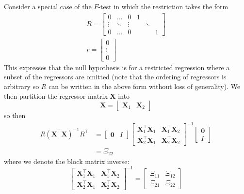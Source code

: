 \documentclass[11pt]{report} %
\begin{document}
Consider a special case of the $F$-test in which the restriction takes the form
\begin{gather}
R = \left[\begin{array}{ccc|ccc}
0 & \dots & 0 & 1 \\
\vdots & \ddots & \vdots & & \ddots \\
0 & \dots & 0 & & & 1
\end{array}\right] \\
r = \begin{bmatrix}
0 \\ \vdots \\ 0
\end{bmatrix}
\end{gather}
This expresses that the null hypothesis is for a restricted regression where a subset of the regressors are omitted (note that the ordering of regressors is arbitrary so $R$ can be written in the above form without loss of generality). We then partition the regressor matrix $\mathbf{X}$ into
\begin{equation}
\mathbf{X} = \begin{bmatrix}\mathbf{X}_{1} & \mathbf{X}_{2}\end{bmatrix}
\end{equation}
so then
\begin{align}
R\left(\mathbf{X}^{\top}\mathbf{X}\right)^{-1}R^{\top} &= \begin{bmatrix}
\mathbf{0} & I\end{bmatrix}\begin{bmatrix}\mathbf{X}_{1}^{\top}\mathbf{X}_{1} & \mathbf{X}_{1}^{\top}\mathbf{X}_{2}\\
\mathbf{X}_{2}^{\top}\mathbf{X}_{1} & \mathbf{X}_{2}^{\top}\mathbf{X}_{2}
\end{bmatrix}^{-1}\begin{bmatrix}\mathbf{0} \\ I\end{bmatrix} \\
&= \Xi_{22}
\end{align}
where we denote the block matrix inverse:
\begin{equation}
\begin{bmatrix}\mathbf{X}_{1}^{\top}\mathbf{X}_{1} & \mathbf{X}_{1}^{\top}\mathbf{X}_{2}\\
\mathbf{X}_{2}^{\top}\mathbf{X}_{1} & \mathbf{X}_{2}^{\top}\mathbf{X}_{2}
\end{bmatrix}^{-1} = \begin{bmatrix}
\Xi_{11} & \Xi_{12} \\ \Xi_{21} & \Xi_{22}
\end{bmatrix}
\end{equation}
\end{document}
